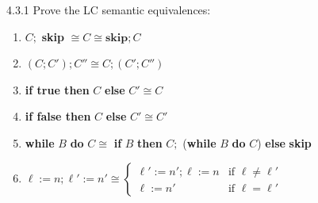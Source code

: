 \begin{exercise}{4.3.1}
Prove the {\sffamily LC} semantic equivalences: 
\begin{enumerate}[label=(\alph*)]
    \item $C;$ \textbf{skip} $\cong C \cong \textbf{skip}; C$
    \item $(C;C');C'' \cong C;(C';C'')$
    \item \textbf{if true then} $C$ \textbf{else} $C' \cong C$
    \item \textbf{if false then} $C$ \textbf{else} $C' \cong C'$
    \item \textbf{while} $B$ \textbf{do} $C \cong$ \textbf{if} $B$ \textbf{then} $C;$ (\textbf{while} $B$ \textbf{do} $C$) \textbf{else} \textbf{skip}
    \item $\ell:=n; \ell':=n' \cong \begin{cases}\ell':=n';  \ell:=n & \mbox{if } \ell \neq \ell' \\ \ell :=n' &  \mbox{if }  \ell = \ell'\end{cases}$
\end{enumerate}

\end{exercise}

